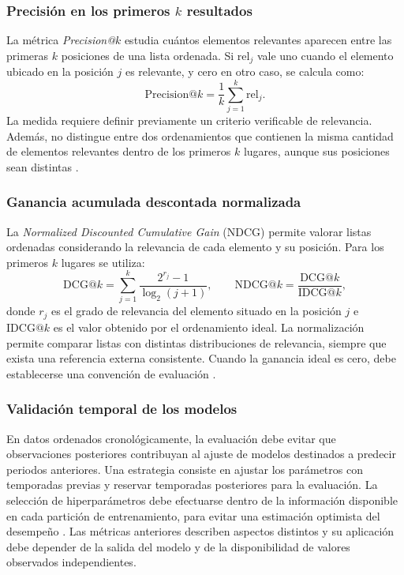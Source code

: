 \subsubsection{Precisión en los primeros $k$ resultados}
La métrica \textit{Precision@$k$} estudia cuántos elementos relevantes aparecen entre las primeras $k$ posiciones de una lista ordenada. Si $\mathrm{rel}_j$ vale uno cuando el elemento ubicado en la posición $j$ es relevante, y cero en otro caso, se calcula como:
\begin{equation}
\mathrm{Precision}@k=\frac{1}{k}\sum_{j=1}^{k}\mathrm{rel}_j.
\end{equation}
La medida requiere definir previamente un criterio verificable de relevancia. Además, no distingue entre dos ordenamientos que contienen la misma cantidad de elementos relevantes dentro de los primeros $k$ lugares, aunque sus posiciones sean distintas \cite{manning2008information}.

\subsubsection{Ganancia acumulada descontada normalizada}
La \textit{Normalized Discounted Cumulative Gain} (NDCG) permite valorar listas ordenadas considerando la relevancia de cada elemento y su posición. Para los primeros $k$ lugares se utiliza:
\begin{equation}
\mathrm{DCG}@k=\sum_{j=1}^{k}\frac{2^{r_j}-1}{\log_2(j+1)},
\qquad
\mathrm{NDCG}@k=\frac{\mathrm{DCG}@k}{\mathrm{IDCG}@k},
\end{equation}
donde $r_j$ es el grado de relevancia del elemento situado en la posición $j$ e $\mathrm{IDCG}@k$ es el valor obtenido por el ordenamiento ideal. La normalización permite comparar listas con distintas distribuciones de relevancia, siempre que exista una referencia externa consistente. Cuando la ganancia ideal es cero, debe establecerse una convención de evaluación \cite{jarvelin2002cumulated,manning2008information}.

\subsubsection{Validación temporal de los modelos}
En datos ordenados cronológicamente, la evaluación debe evitar que observaciones posteriores contribuyan al ajuste de modelos destinados a predecir periodos anteriores. Una estrategia consiste en ajustar los parámetros con temporadas previas y reservar temporadas posteriores para la evaluación. La selección de hiperparámetros debe efectuarse dentro de la información disponible en cada partición de entrenamiento, para evitar una estimación optimista del desempeño \cite{hastie2009elements,cawley2010selection}. Las métricas anteriores describen aspectos distintos y su aplicación debe depender de la salida del modelo y de la disponibilidad de valores observados independientes.